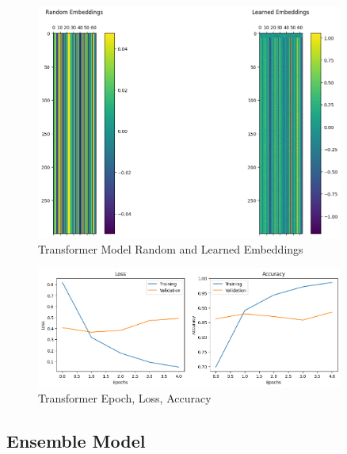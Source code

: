 \begin{figure}[h!]  
    \centering
    \includegraphics[width=0.9\textwidth]{Images/T EMBED.png}  
    \caption*{Transformer Model Random and Learned Embeddings}
    \label{lstm t embed}  %
\end{figure}

\begin{figure}[h!]  
    \centering
    \includegraphics[width=0.9\textwidth]{Images/T LOSS EPOCH.png}  
    \caption*{Transformer Epoch, Loss, Accuracy}
    \label{lstm t epch}  %
\end{figure}


\pagebreak

\subsection{Ensemble Model}

